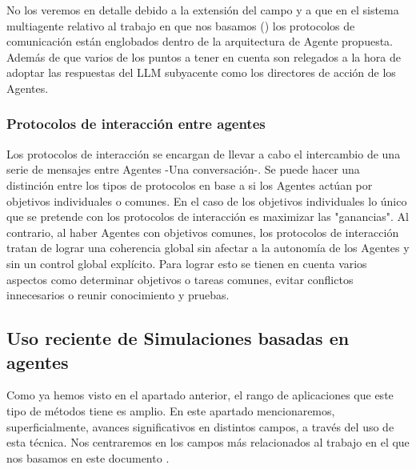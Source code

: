 No los veremos en detalle debido a la extensión del campo y a que en el sistema multiagente relativo al trabajo en que nos basamos (\cite{park2023generative}) los protocolos de comunicación están englobados dentro de la arquitectura de Agente propuesta. Además de que varios de los puntos a tener en cuenta son relegados a la hora de adoptar las respuestas del LLM subyacente como los directores de acción de los Agentes.

\subsubsection{Protocolos de interacción entre agentes}

Los protocolos de interacción se encargan de llevar a cabo el intercambio de una serie de mensajes entre Agentes -Una conversación-. Se puede hacer una distinción entre los tipos de protocolos en base a si los Agentes actúan por objetivos individuales o comunes. En el caso de los objetivos individuales lo único que se pretende con los protocolos de interacción es maximizar las "ganancias". Al contrario, al haber Agentes con objetivos comunes, los protocolos de interacción tratan de lograr una coherencia global sin afectar a la autonomía de los Agentes y sin un control global explícito. Para lograr esto se tienen en cuenta varios aspectos como determinar objetivos o tareas comunes, evitar conflictos innecesarios o reunir conocimiento y pruebas.

\subsection{Uso reciente de Simulaciones basadas en agentes}

Como ya hemos visto en el apartado anterior, el rango de aplicaciones que este tipo de métodos tiene es amplio. En este apartado mencionaremos, superficialmente, avances significativos en distintos campos, a través del uso de esta técnica. Nos centraremos en los campos más relacionados al trabajo en el que nos basamos en este documento \cite{park2023generative}.

